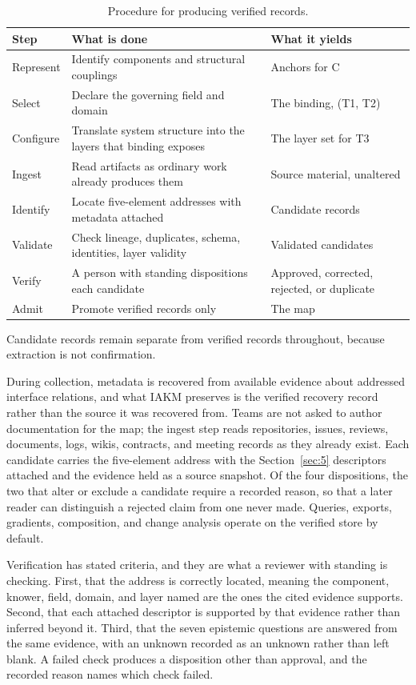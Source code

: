 \documentclass[preprints,article,submit,moreauthors]{Definitions/mdpi}
\begin{document}
\begin{table}[H]
\caption{Procedure for producing verified records.}
\label{tab:procedure}
\centering
\scriptsize
\begin{tabularx}{\textwidth}{W{0.5}W{1.35}W{1.15}}
\hline
\textbf{Step} & \textbf{What is done} & \textbf{What it yields} \\
\hline
Represent & Identify components and structural couplings & Anchors for C \\
Select & Declare the governing field and domain & The binding, (T1, T2) \\
Configure & Translate system structure into the layers that binding exposes & The layer set for T3 \\
Ingest & Read artifacts as ordinary work already produces them & Source material, unaltered \\
Identify & Locate five-element addresses with metadata attached & Candidate records \\
Validate & Check lineage, duplicates, schema, identities, layer validity & Validated candidates \\
Verify & A person with standing dispositions each candidate & Approved, corrected, rejected, or duplicate \\
Admit & Promote verified records only & The map \\
\hline
\end{tabularx}
\end{table}

Candidate records remain separate from verified records throughout, because extraction is not confirmation.

During collection, metadata is recovered from available evidence about addressed interface relations, and what IAKM preserves is the verified recovery record rather than the source it was recovered from. Teams are not asked to author documentation for the map; the ingest step reads repositories, issues, reviews, documents, logs, wikis, contracts, and meeting records as they already exist. Each candidate carries the five-element address with the Section~\ref{sec:5} descriptors attached and the evidence held as a source snapshot. Of the four dispositions, the two that alter or exclude a candidate require a recorded reason, so that a later reader can distinguish a rejected claim from one never made. Queries, exports, gradients, composition, and change analysis operate on the verified store by default.

Verification has stated criteria, and they are what a reviewer with standing is checking. First, that the address is correctly located, meaning the component, knower, field, domain, and layer named are the ones the cited evidence supports. Second, that each attached descriptor is supported by that evidence rather than inferred beyond it. Third, that the seven epistemic questions are answered from the same evidence, with an unknown recorded as an unknown rather than left blank. A failed check produces a disposition other than approval, and the recorded reason names which check failed.
\end{document}
